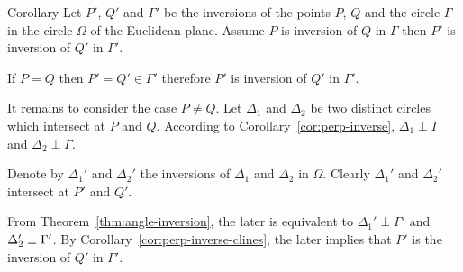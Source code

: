 \begin{thm}{Corollary}\label{cor:invese-comp}
Let $P'$, $Q'$ and $\Gamma'$ 
be the inversions of the points $P$, $Q$ and the circle $\Gamma$ in the circle $\Omega$ of the Euclidean plane.
Assume $P$ is inversion of $Q$ in $\Gamma$ then 
$P'$ is inversion of $Q'$ in $\Gamma'$.
\end{thm}

If $P=Q$ then $P'=Q'\in\Gamma'$ therefore $P'$ is inversion of $Q'$ in $\Gamma'$.

It remains to consider the case $P\ne Q$. 
Let $\Delta_1$ and $\Delta_2$ be two distinct circles which intersect at $P$ and $Q$.
According to Corollary~\ref{cor:perp-inverse}, 
$\Delta_1\perp\Gamma$ and $\Delta_2\perp\Gamma$.

Denote by $\Delta_1'$ and $\Delta_2'$ the inversions of $\Delta_1$ and $\Delta_2$ in $\Omega$.
Clearly $\Delta_1'$ and $\Delta_2'$ intersect at $P'$ and $Q'$.

From Theorem~\ref{thm:angle-inversion}, 
the later is equivalent 
to $\Delta_1'\perp\Gamma'$ and $\Delta_2'\z\perp\Gamma'$.
By Corollary~\ref{cor:perp-inverse-clines},
the later implies that $P'$ is the inversion of $Q'$ in $\Gamma'$.
\qeds

